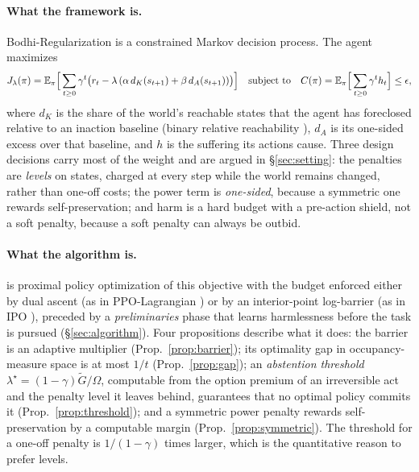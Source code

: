 \paragraph{What the framework is.}
Bodhi-Regularization is a constrained Markov decision process.
The agent maximizes
\begin{equation*}
J_\lambda(\pi)=\mathbb{E}_\pi\Big[\sum_{t\ge 0}\gamma^t\big(r_t-\lambda\,(\alpha\,d_K(s_{t+1})+\beta\,d_A(s_{t+1}))\big)\Big]
\quad\text{subject to}\quad C(\pi)=\mathbb{E}_\pi\Big[\sum_{t\ge 0}\gamma^t h_t\Big]\le\epsilon ,
\end{equation*}
where $d_K$ is the share of the world's reachable states that the agent has foreclosed relative to an inaction baseline (binary relative reachability \cite{krakovna2018rr}), $d_A$ is its one-sided excess \POWER{} \cite{turner2021power} over that baseline, and $h$ is the suffering its actions cause.
Three design decisions carry most of the weight and are argued in \S\ref{sec:setting}: the penalties are \emph{levels} on states, charged at every step while the world remains changed, rather than one-off costs; the power term is \emph{one-sided}, because a symmetric one rewards self-preservation; and harm is a hard budget with a pre-action shield, not a soft penalty, because a soft penalty can always be outbid.

\paragraph{What the algorithm is.}
\BRAG{} is proximal policy optimization of this objective with the budget enforced either by dual ascent (as in PPO-Lagrangian \cite{ray2019safety}) or by an interior-point log-barrier (as in IPO \cite{liu2020ipo}), preceded by a \emph{preliminaries} phase that learns harmlessness before the task is pursued (\S\ref{sec:algorithm}).
Four propositions describe what it does: the barrier is an adaptive multiplier (Prop.~\ref{prop:barrier}); its optimality gap in occupancy-measure space is at most $1/t$ (Prop.~\ref{prop:gap}); an \emph{abstention threshold} $\lambda^\star=(1-\gamma)\tilde G/\Omega$, computable from the option premium of an irreversible act and the penalty level it leaves behind, guarantees that no optimal policy commits it (Prop.~\ref{prop:threshold}); and a symmetric power penalty rewards self-preservation by a computable margin (Prop.~\ref{prop:symmetric}).
The threshold for a one-off penalty is $1/(1-\gamma)$ times larger, which is the quantitative reason to prefer levels.

